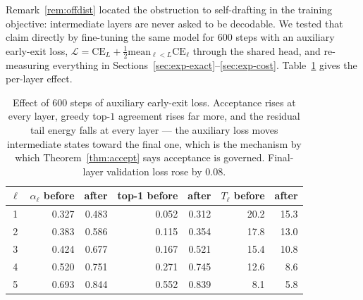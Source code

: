 Remark~\ref{rem:offdist} located the obstruction to self-drafting in the
training objective: intermediate layers are never asked to be decodable. We
tested that claim directly by fine-tuning the same model for $600$ steps with
an auxiliary early-exit loss, $\mathcal{L} = \mathrm{CE}_L + \tfrac12
\mathrm{mean}_{\ell<L}\mathrm{CE}_\ell$ through the shared head, and
re-measuring everything in Sections~\ref{sec:exp-exact}--\ref{sec:exp-cost}.
Table~\ref{tab:eetrain} gives the per-layer effect.

\begin{table}[h]
\centering
\begin{tabular}{crrrrrr}
\toprule
$\ell$ & $\alpha_\ell$ before & after & top-1 before & after & $T_\ell$ before & after \\
\midrule
1 & 0.327 & 0.483 & 0.052 & 0.312 & 20.2 & 15.3 \\
2 & 0.383 & 0.586 & 0.115 & 0.354 & 17.8 & 13.0 \\
3 & 0.424 & 0.677 & 0.167 & 0.521 & 15.4 & 10.8 \\
4 & 0.520 & 0.751 & 0.271 & 0.745 & 12.6 & 8.6 \\
5 & 0.693 & 0.844 & 0.552 & 0.839 & 8.1 & 5.8 \\
\bottomrule
\end{tabular}
\caption{Effect of $600$ steps of auxiliary early-exit loss. Acceptance rises
at every layer, greedy top-$1$ agreement rises far more, and the residual tail
energy falls at every layer --- the auxiliary loss moves intermediate states
toward the final one, which is the mechanism by which Theorem~\ref{thm:accept}
says acceptance is governed. Final-layer validation loss rose by $0.08$.}
\label{tab:eetrain}
\end{table}

